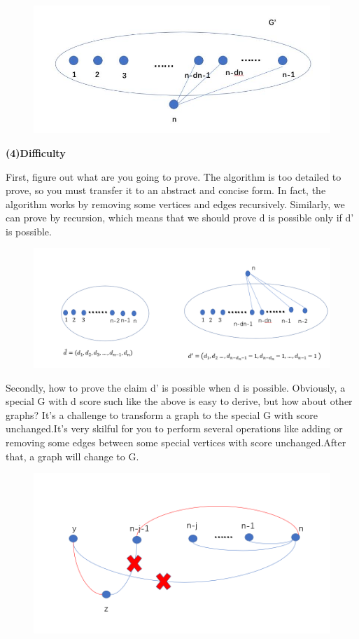 \begin{figure}[hpbt]
\begin{center}
\includegraphics[width = 0.8 \textwidth]{score.png}
\end{center}
\end{figure}
\par
\textbf{(4)Difficulty}
\par First, figure out what are you going to prove. The algorithm is too detailed to prove, so you must transfer it to an abstract and concise form. In fact, the algorithm works by removing some vertices and edges recursively. Similarly, we can prove by recursion, which means that we should prove d is possible only if d' is possible.
\begin{figure}[hpbt]
\begin{center}
\includegraphics[width = 0.8 \textwidth]{ex1_4_1.png}
\end{center}
\end{figure}
\par Secondly, how to prove the claim d' is possible when d is possible. Obviously, a special G with d score such like the above is easy to derive, but how about other graphs? It's a challenge to transform a graph to the special G with score unchanged.It's very skilful for you to perform several operations like adding or removing some edges between some special vertices with score unchanged.After that, a graph will change to G. 
\begin{figure}[hpbt]
\begin{center}
\includegraphics[width = 0.8 \textwidth]{ex1_4_2.png}
\end{center}
\end{figure}

